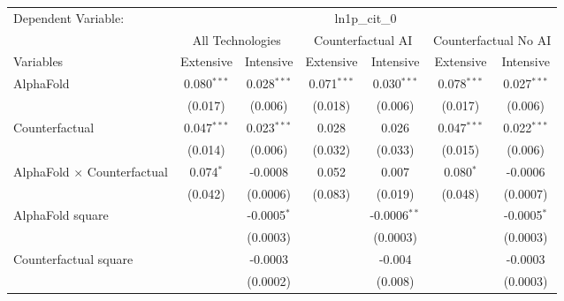 \begingroup
\centering
\begin{tabular}{lcccccc}
   \tabularnewline \midrule \midrule
   Dependent Variable: & \multicolumn{6}{c}{ln1p\_cit\_0}\\
 & \multicolumn{2}{c}{All Technologies} & \multicolumn{2}{c}{Counterfactual AI} & \multicolumn{2}{c}{Counterfactual No AI} \\
\cmidrule(lr){1-1}\cmidrule(lr){2-3} \cmidrule(lr){4-5} \cmidrule(lr){6-7}
Variables & \multicolumn{1}{c}{Extensive} & \multicolumn{1}{c}{Intensive} & \multicolumn{1}{c}{Extensive} & \multicolumn{1}{c}{Intensive} & \multicolumn{1}{c}{Extensive} & \multicolumn{1}{c}{Intensive} \\
\cmidrule(lr){1-1}\cmidrule(lr){2-2} \cmidrule(lr){3-3} \cmidrule(lr){4-4} \cmidrule(lr){5-5} \cmidrule(lr){6-6} \cmidrule(lr){7-7}
   AlphaFold                          & 0.080$^{***}$ & 0.028$^{***}$ & 0.071$^{***}$ & 0.030$^{***}$  & 0.078$^{***}$ & 0.027$^{***}$\\   
                                      & (0.017)       & (0.006)       & (0.018)       & (0.006)        & (0.017)       & (0.006)\\   
   Counterfactual                     & 0.047$^{***}$ & 0.023$^{***}$ & 0.028         & 0.026          & 0.047$^{***}$ & 0.022$^{***}$\\   
                                      & (0.014)       & (0.006)       & (0.032)       & (0.033)        & (0.015)       & (0.006)\\   
   AlphaFold $\times$ Counterfactual  & 0.074$^{*}$   & -0.0008       & 0.052         & 0.007          & 0.080$^{*}$   & -0.0006\\   
                                      & (0.042)       & (0.0006)      & (0.083)       & (0.019)        & (0.048)       & (0.0007)\\   
   AlphaFold square                   &               & -0.0005$^{*}$ &               & -0.0006$^{**}$ &               & -0.0005$^{*}$\\   
                                      &               & (0.0003)      &               & (0.0003)       &               & (0.0003)\\   
   Counterfactual square              &               & -0.0003       &               & -0.004         &               & -0.0003\\   
                                      &               & (0.0002)      &               & (0.008)        &               & (0.0003)\\   

\end{tabular}
